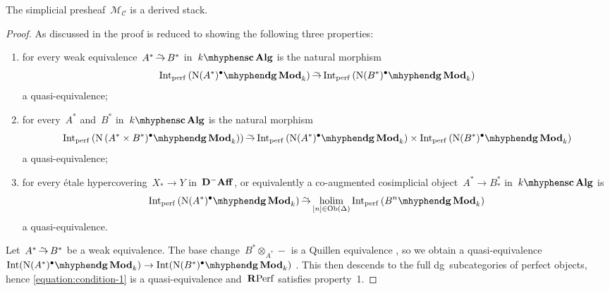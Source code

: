\begin{refsection}
\begin{theorem}
  \label{theorem:derived-moduli-stack-is-stack}
  The simplicial presheaf~$\mathcal{M}_{\mathcal{C}}$ is a derived stack.

  \begin{proof}[Proof]
    As discussed in \cite[\S 2.1.1]{hagII} the proof is reduced to showing the following three properties:
    \begin{enumerate}
      \item for every weak equivalence~$A^*\weq B^*$ in~$\scAlg{k}$ is the natural morphism
        \begin{equation}
          \label{equation:condition-1}
          \Int_\perf\left( \dgMod{\nerve(A^*)^\bullet}_k \right)\weq\Int_\perf\left( \dgMod{\nerve(B^*)^\bullet}_k \right)
        \end{equation}
        a quasi-equivalence;
      \item for every~$A^*$ and~$B^*$ in~$\scAlg{k}$ is the natural morphism
        \begin{equation}
          \Int_\perf\left( \dgMod{\nerve\left( A^*\times B^*)^\bullet}_k \right) \right)\weq\Int_\perf\left( \dgMod{\nerve(A^*)^\bullet}_k \right)\times\Int_\perf\left( \dgMod{\nerve(B^*)^\bullet}_k \right)
        \end{equation}
        a quasi-equivalence;
      \item for every \'etale hypercovering~$X_*\to Y$ in~$\mathbf{D}^-\mathbf{Aff}$, or equivalently a co-augmented cosimplicial object~$A^*\to B_*^*$ in~$\scAlg{k}$ is
        \begin{equation}
          \label{equation:condition-3}
          \Int_\perf\left( \dgMod{\nerve(A^*)^\bullet}_k \right)\weq\holim_{[n]\in\Ob(\Delta)}\Int_\perf\left( \dgMod{B^n}_k \right)
        \end{equation}
        a quasi-equivalence.
    \end{enumerate}

    Let~$A^*\weq B^*$ be a weak equivalence. The base change~$B^*\otimes_{A^*}-$ is a Quillen equivalence \addreference, so we obtain a quasi-equivalence~$\Int(\dgMod{\nerve(A^*)^\bullet}_k)\to\Int(\dgMod{\nerve(B^*)^\bullet}_k)$ \cite[proposition 3.2]{toen}. This then descends to the full dg~subcategories of perfect objects, hence \eqref{equation:condition-1} is a quasi-equivalence and~$\mathbf{R}\mathrm{Perf}$ satisfies property~1.


\end{proof}
\end{theorem}
\end{refsection}

